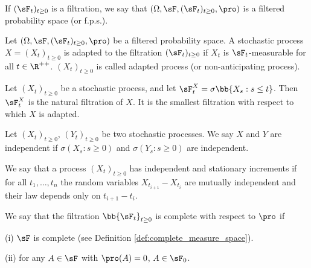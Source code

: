 \begin{definition}
If $(\sF_t)_{t\geq 0}$ is a filtration, we say that $(\Omega,\sF, (\sF_t)_{t\geq 0},\pro)$ is a filtered probability space (or f.p.s.).
\end{definition}

\begin{definition}\label{def:adapted_process_continuous}
Let $(\Omega,\sF, (\sF_t)_{t\geq 0},\pro)$ be a filtered probability space. A stochastic process $X = (X_t)_{t\geq 0}$ is adapted to the filtration $(\sF_t)_{t\geq 0}$ if $X_t$ is $\sF_t$-measurable for all $t\in \R^{++}$. $(X_t)_{t\geq 0}$ is called adapted process (or non-anticipating process).
\end{definition}


\begin{definition}
Let $(X_t)_{t\geq 0}$ be a stochastic process, and let $\sF^X_t = \sigma\bb{X_s: s \leq t}$. Then $\sF^X_t$ is the natural filtration of $X$. It is the smallest filtration with respect to which $X$ is adapted.
\end{definition}

\begin{definition}\label{def:independence_stochastic_process}
Let $(X_t)_{t\geq 0}$, $(Y_t)_{t\geq 0}$ be two stochastic processes. We say $X$ and $Y$ are independent if $\sigma(X_s: s \geq 0)$ and $\sigma(Y_s: s \geq 0)$ are independent.
\end{definition}

\begin{definition}\label{def:independent_stationary_increments_stochastic_process}
We say that a process $(X_t)_{t \geq 0}$ has independent and stationary increments if for all $t_1,\dots, t_n$ the random variables $X_{t_{i+1}} -X_{t_i}$ are mutually independent and their law depends only on $t_{i+1} - t_i$.
\end{definition}

\begin{definition}\label{def:complete_filtration}
We say that the filtration $\bb{\sF_t}_{t\geq 0}$ is complete with respect to $\pro$ if
\ben
\item [(i)] $\sF$ is complete (see Definition \ref{def:complete_measure_space}).
\item [(ii)] for any $A\in \sF$ with $\pro(A)=0$, $A\in \sF_0$.	
\een%
\end{definition}


